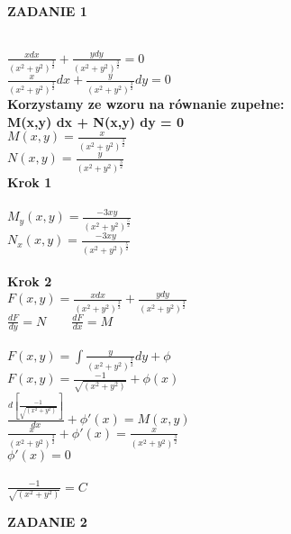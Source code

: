 \documentclass[10pt,a4paper]{article}
\author{ola}
\begin{document}
	\textbf{ZADANIE 1} 
    \begin{center}
	\\
	$\frac{x dx}{(x^2+y^2)^{\frac{3}{2}}} + \frac{y dy}{(x^2+y^2)^{\frac{3}{2}}} = 0$ \\
	$\frac{x}{(x^2+y^2)^{\frac{3}{2}}} dx + \frac{y}{(x^2+y^2)^{\frac{3}{2}}} dy = 0 $ \\
	\textbf{Korzystamy ze wzoru na równanie zupełne:} \\
    \textbf{ M(x,y) dx + N(x,y) dy = 0} \\
	$M(x,y) = \frac{x}{(x^2+y^2)^{\frac{3}{2}}}$ \\
	$N(x,y) = \frac{y}{(x^2+y^2)^{\frac{3}{2}}}$ \\
	\textbf{Krok 1} \\
	 \\
	$M_{y}(x,y) = \frac{-3xy}{(x^2+y^2)^{\frac{5}{2}}}$ \\
	$N_{x}(x,y) = \frac{-3xy}{(x^2+y^2)^{\frac{5}{2}}}$ \\
	 \\
	\textbf{Krok 2}\\
	$F(x,y) = \frac{x dx}{(x^2+y^2)^{\frac{3}{2}}} + \frac{y dy}{(x^2+y^2)^{\frac{3}{2}}} $ \\
	$\frac{dF}{dy} = N \qquad \frac{dF}{dx}=M $\\
	 \\
	$F(x,y) = \int \frac{y}{(x^2+y^2)^{\frac{3}{2}}} dy + \phi$ \\
	$F(x,y) = \frac{-1}{\sqrt{(x^2+y^2)}} +\phi (x) $ \\
	$\frac{d [\frac{-1}{\sqrt{(x^2+y^2)}}] }{dx} +\phi' (x) = M(x,y) $ \\
	$\frac{x}{(x^2+y^2)^{\frac{3}{2}}} + \phi'(x) = \frac{x}{(x^2+y^2)^{\frac{3}{2}}}$ \\
	$\phi'(x) = 0$ \\
	\\
	$\frac{-1}{\sqrt{(x^2+y^2)}} = C$
	\newpage

    \end{center} 
	\textbf{ZADANIE 2} 
\end{document}
